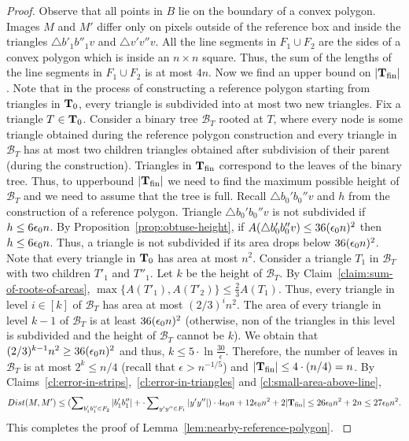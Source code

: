 \documentclass[11pt,english]{article}
\numberwithin{figure}{section}
\newcommand{\eps}{{\epsilon}}
\newcommand{\Dis}{Dist}
\newcommand{\Tfin}{{\bf T}_{\text{fin}}}
\newcommand{\Tstart}{{\bf T}_0}
\begin{document}
\begin{proof}
{Observe that all points in $B$ lie on the boundary of a convex polygon. Images $M$ and $M'$ differ only on pixels outside of the reference box and inside the triangles $\bigtriangleup b'_1b''_1v$ and $\bigtriangleup v'v''v$. All the line segments in $F_1\cup F_2$ are the sides of a convex polygon which is inside an $n\times n$ square. Thus, the sum of the lengths of the line segments in $F_1\cup F_2$ is at most $4n$. Now we find an upper bound on $|\Tfin|$. Note that in the process of constructing a reference polygon starting from triangles in $\Tstart$, every triangle is subdivided into at most two new triangles. Fix a triangle $T\in\Tstart$. Consider a binary tree $\mathcal{B}_T$ rooted at $T$, where every node is some triangle obtained during the reference polygon construction and every triangle in $\mathcal{B}_T$ has at most two children triangles obtained after subdivision of their parent (during the construction). Triangles in $\Tfin$ correspond to the leaves of the binary tree. Thus, to upperbound $|\Tfin|$ we need to find the maximum possible height of $\mathcal{B}_T$ and we need to assume that the tree is full. Recall $\bigtriangleup b_0'b_0''v$ and $h$ from the construction of a reference polygon. Triangle $\bigtriangleup b_0'b_0''v$ is not subdivided if $h\leq6{\epsilon_0} n$. By Proposition~\ref{prop:obtuse-height}, if $A(\bigtriangleup b_0'b_0''v)\leq 36({\epsilon_0} n)^2$ then $h\leq 6{\epsilon_0} n$. Thus, a triangle is not subdivided if its area drops below $36({\epsilon_0} n)^2$. Note that every triangle in $\Tstart$ has area at most $n^2$. Consider a triangle $T_1$ in $\mathcal{B}_T$ with two children $T'_1$ and $T''_1$. Let $k$ be the height of $\mathcal{B}_T$. By Claim~\ref{claim:sum-of-roots-of-areas}, $\max\{A(T'_1),A(T'_2)\}\leq \frac 2 3 A(T_1)$.
Thus, every triangle in level $i\in[k]$ of $\mathcal{B}_T$ has area at most $(2/3)^i n^2$. The area of every triangle in level $k-1$ of $\mathcal{B}_T$ is at least $36({\epsilon_0} n)^2$ (otherwise, non of the triangles in this level is subdivided and the height of $\mathcal{B}_T$ cannot be $k$). We obtain that $(2/3)^{k-1} n^2\geq 36({\epsilon_0} n)^2$ and thus, $k\leq 5\cdot\ln \frac {30} {\eps}$. Therefore, the number of leaves in $\mathcal{B}_T$ is at most $2^k\leq n/4$ (recall that $\eps>n^{-1/5}$) and $|\Tfin|\leq 4\cdot(n/4)=n$. By Claims~\ref{cl:error-in-strips},~\ref{cl:error-in-triangles} and \ref{cl:small-area-above-line},
$$
\Dis(M,M')\leq (\sum\nolimits_{ b'_1b''_1 \in F_2}|b'_1b''_1|+\cdot\sum\nolimits_{ y'y'' \in F_1}|y'y''|)\cdot4\bigdelta n+12\bigdelta n^2+2|\Tfin|\leq 26\bigdelta n^2+2n\leq 27\bigdelta n^2.
$$
This completes the proof of Lemma~\ref{lem:nearby-reference-polygon}. }
\end{proof}
\end{document}
